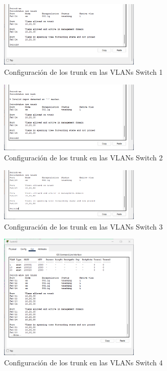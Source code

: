     \begin{figure}[H]
        \centering
        \includegraphics[width=0.6\textwidth]{img/tunksw1.png}
        \caption{Configuración de los trunk en las VLANs Switch 1}
        \label{fig:swtru1}
    \end{figure}
    \begin{figure}[H]
        \centering
        \includegraphics[width=0.6\textwidth]{img/trunksw2.png}
        \caption{Configuración de los trunk en las VLANs Switch 2}
        \label{fig:swtru2}
    \end{figure}
    \begin{figure}[H]
        \centering
        \includegraphics[width=0.6\textwidth]{img/trunk sw3.png}
        \caption{Configuración de los trunk en las VLANs Switch 3}
        \label{fig:swtru3}
    \end{figure}
    \begin{figure}[H]
        \centering
        \includegraphics[width=0.6\textwidth]{img/trunsw4.png}
        \caption{Configuración de los trunk en las VLANs Switch 4}
        \label{fig:swtru4}
    \end{figure}
